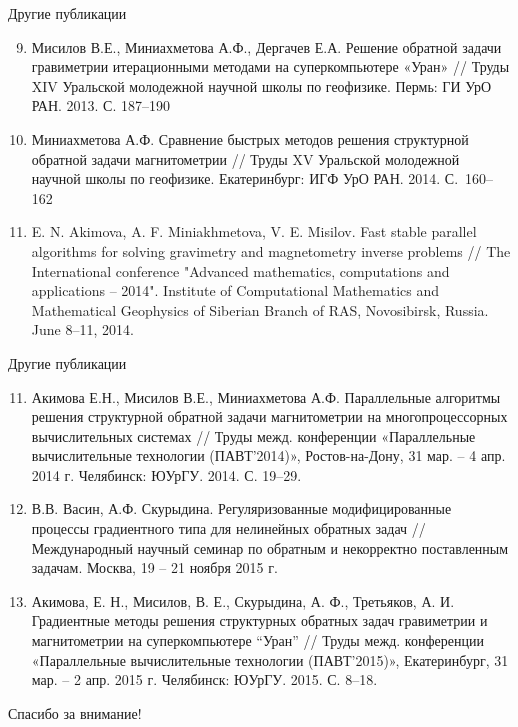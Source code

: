 \documentclass[10pt,pdf, mathserif, hyperref={unicode}]{beamer}
\begin{document}
\begin{frame}{Другие публикации}
	\begin{enumerate}
		\setcounter{enumi}{8}
			\item Мисилов В.Е., Миниахметова А.Ф., Дергачев Е.А. Решение обратной задачи гравиметрии итерационными методами на суперкомпьютере «Уран» // Труды XIV Уральской молодежной научной школы по геофизике. Пермь:
			ГИ УрО РАН.  2013. С. 187–190
			\item Миниахметова А.Ф. Сравнение быстрых методов решения структурной обратной задачи магнитометрии // Труды XV Уральской молодежной научной школы по геофизике. Екатеринбург: ИГФ УрО РАН. 2014. С.~160–162
			\item E. N. Akimova, A. F. Miniakhmetova, V. E. Misilov. Fast stable parallel algorithms for solving gravimetry and magnetometry inverse problems // The International conference "Advanced mathematics, computations and applications – 2014". Institute of Computational Mathematics and Mathematical Geophysics of Siberian Branch of RAS, Novosibirsk, Russia. June 8–11, 2014.
	\end{enumerate}
\end{frame}
\begin{frame}{Другие публикации}
	\begin{enumerate}
		\setcounter{enumi}{10}
		\item Акимова Е.Н., Мисилов В.Е., Миниахметова А.Ф. Параллельные алгоритмы решения структурной обратной задачи магнитометрии на многопроцессорных вычислительных системах  // Труды межд. конференции «Параллельные вычислительные технологии (ПАВТ’2014)», Ростов-на-Дону, 31 мар. – 4 апр. 2014 г. Челябинск:  ЮУрГУ. 2014. С. 19–29.
		\item В.В. Васин, А.Ф. Скурыдина. Регуляризованные модифицированные процессы градиентного типа для нелинейных обратных задач // Международный научный семинар по обратным и некорректно поставленным задачам. Москва, 19 – 21 ноября 2015 г.
		\item Акимова, Е. Н., Мисилов, В. Е., Скурыдина, А. Ф., Третьяков, А. И. Градиентные методы решения структурных обратных задач гравиметрии и магнитометрии на суперкомпьютере “Уран” // Труды межд. конференции «Параллельные вычислительные технологии (ПАВТ’2015)», Екатеринбург, 31 мар. – 2 апр. 2015 г. Челябинск: ЮУрГУ.  2015. С. 8–18.
	\end{enumerate}
\end{frame}

\begin{frame}\label{lastpage}
	\Huge{\centerline{Спасибо за внимание!}}
\end{frame}
\end{document}
